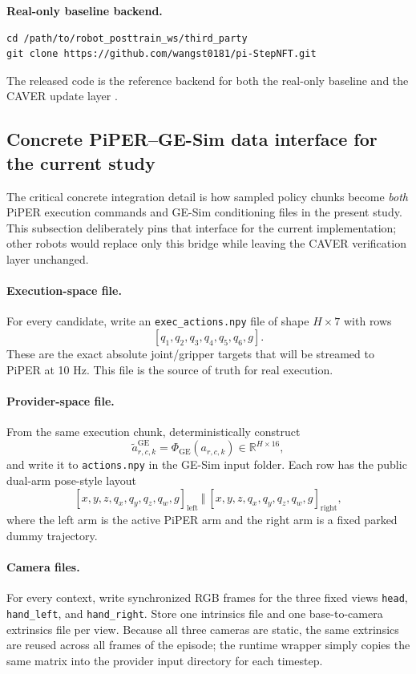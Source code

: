 \documentclass[10pt]{article}
\theoremstyle{plain}
\theoremstyle{definition}
\theoremstyle{remark}
\begin{document}
\textbf{Real-only baseline backend.}
\begin{lstlisting}
cd /path/to/robot_posttrain_ws/third_party
git clone https://github.com/wangst0181/pi-StepNFT.git
\end{lstlisting}
The released code is the reference backend for both the real-only baseline and the CAVER update layer \citep{pistepnftrepo2026}.

\subsection{Concrete PiPER--GE-Sim data interface for the current study}
The critical concrete integration detail is how sampled policy chunks become \emph{both} PiPER execution commands and GE-Sim conditioning files in the present study. This subsection deliberately pins that interface for the current implementation; other robots would replace only this bridge while leaving the CAVER verification layer unchanged.

\paragraph{Execution-space file.}
For every candidate, write an \texttt{exec\_actions.npy} file of shape $H\times 7$ with rows
\[
[q_1,q_2,q_3,q_4,q_5,q_6,g].
\]
These are the exact absolute joint/gripper targets that will be streamed to PiPER at 10 Hz. This file is the source of truth for real execution.

\paragraph{Provider-space file.}
From the same execution chunk, deterministically construct
\[
\tilde a^{\mathrm{GE}}_{r,c,k}=\Phi_{\mathrm{GE}}(a_{r,c,k})\in\mathbb R^{H\times 16},
\]
and write it to \texttt{actions.npy} in the GE-Sim input folder. Each row has the public dual-arm pose-style layout
\[
[x,y,z,q_x,q_y,q_z,q_w,g]_{\text{left}}\ \Vert\
[x,y,z,q_x,q_y,q_z,q_w,g]_{\text{right}},
\]
where the left arm is the active PiPER arm and the right arm is a fixed parked dummy trajectory.

\paragraph{Camera files.}
For every context, write synchronized RGB frames for the three fixed views \texttt{head}, \texttt{hand\_left}, and \texttt{hand\_right}. Store one intrinsics file and one base-to-camera extrinsics file per view. Because all three cameras are static, the same extrinsics are reused across all frames of the episode; the runtime wrapper simply copies the same matrix into the provider input directory for each timestep.
\end{document}
